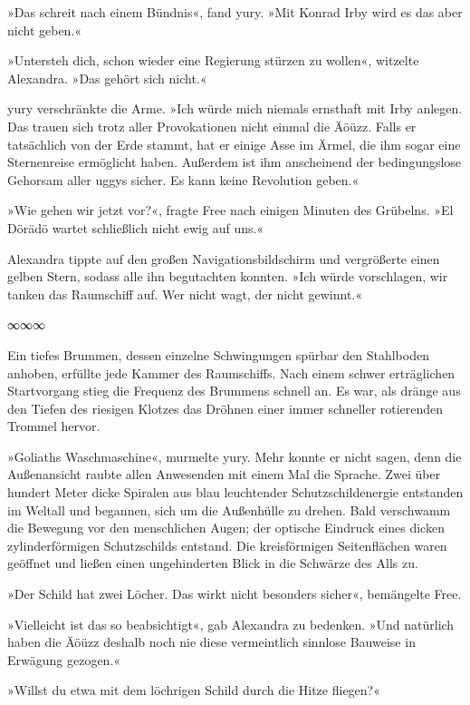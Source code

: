 »Das schreit nach einem Bündnis«, fand yury. »Mit Konrad Irby wird es das aber nicht geben.«

»Untersteh dich, schon wieder eine Regierung stürzen zu wollen«, witzelte Alexandra. »Das gehört sich nicht.«

yury verschränkte die Arme. »Ich würde mich niemals ernsthaft mit Irby anlegen. Das trauen sich trotz aller Provokationen nicht einmal die Äöüzz. Falls er tatsächlich von der Erde stammt, hat er einige Asse im Ärmel, die ihm sogar eine Sternenreise ermöglicht haben. Außerdem ist ihm anscheinend der bedingungslose Gehorsam aller uggys sicher. Es kann keine Revolution geben.«

»Wie gehen wir jetzt vor?«, fragte Free nach einigen Minuten des Grübelns. »El Dörädö wartet schließlich nicht ewig auf uns.«

Alexandra tippte auf den großen Navigationsbildschirm und vergrößerte einen gelben Stern, sodass alle ihn begutachten konnten. »Ich würde vorschlagen, wir tanken das Raumschiff auf. Wer nicht wagt, der nicht gewinnt.«

\begin{center}
∞∞∞
\end{center}

Ein tiefes Brummen, dessen einzelne Schwingungen spürbar den Stahlboden anhoben, erfüllte jede Kammer des Raumschiffs. Nach einem schwer erträglichen Startvorgang stieg die Frequenz des Brummens schnell an. Es war, als dränge aus den Tiefen des riesigen Klotzes das Dröhnen einer immer schneller rotierenden Trommel hervor.

»Goliaths Waschmaschine«, murmelte yury. Mehr konnte er nicht sagen, denn die Außenansicht raubte allen Anwesenden mit einem Mal die Sprache. Zwei über hundert Meter dicke Spiralen aus blau leuchtender Schutzschildenergie entstanden im Weltall und begannen, sich um die Außenhülle zu drehen. Bald verschwamm die Bewegung vor den menschlichen Augen; der optische Eindruck eines dicken zylinderförmigen Schutzschilds entstand. Die kreisförmigen Seitenflächen waren geöffnet und ließen einen ungehinderten Blick in die Schwärze des Alls zu.

»Der Schild hat zwei Löcher. Das wirkt nicht besonders sicher«, bemängelte Free.

»Vielleicht ist das so beabsichtigt«, gab Alexandra zu bedenken. »Und natürlich haben die Äöüzz deshalb noch nie diese vermeintlich sinnlose Bauweise in Erwägung gezogen.«

»Willst du etwa mit dem löchrigen Schild durch die Hitze fliegen?«

